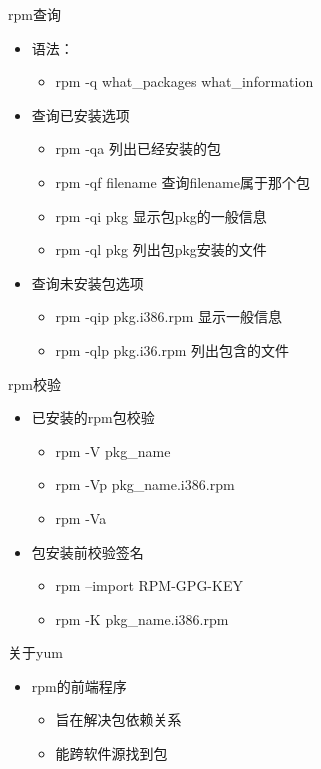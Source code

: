 \begin{frame}{rpm查询}
\begin{itemize}
\item 语法：

\begin{itemize}
\item rpm -q what\_packages what\_information
\end{itemize}
\item 查询已安装选项

\begin{itemize}
\item rpm -qa 列出已经安装的包
\item rpm -qf filename 查询filename属于那个包
\item rpm -qi pkg 显示包pkg的一般信息
\item rpm -ql pkg 列出包pkg安装的文件
\end{itemize}
\item 查询未安装包选项

\begin{itemize}
\item rpm -qip pkg.i386.rpm 显示一般信息
\item rpm -qlp pkg.i36.rpm 列出包含的文件
\end{itemize}
\end{itemize}

\end{frame} 
\begin{frame}{rpm校验}
\begin{itemize}
\item 已安装的rpm包校验

\begin{itemize}
\item rpm -V pkg\_name
\item rpm -Vp pkg\_name.i386.rpm
\item rpm -Va
\end{itemize}
\item 包安装前校验签名

\begin{itemize}
\item rpm --import RPM-GPG-KEY
\item rpm -K pkg\_name.i386.rpm
\end{itemize}
\end{itemize}

\end{frame} 
\begin{frame}{关于yum}
\begin{itemize}
\item rpm的前端程序

\begin{itemize}
\item 旨在解决包依赖关系
\item 能跨软件源找到包
\end{itemize}
\end{itemize}

\end{frame} 

